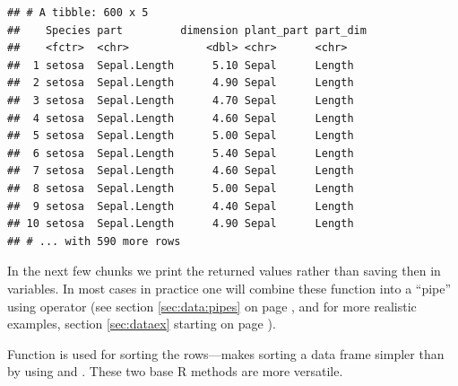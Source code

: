 \documentclass[krantz2,ChapterTOCs]{krantz}\usepackage{knitr}
\begin{document}
\begin{knitrout}\footnotesize
{}\color{fgcolor}\begin{kframe}
\begin{alltt}
 \hlkwb{<-} 
                     \hlstd{=}  \hlstd{),}
                     \hlstd{=}  \hlstd{))}
\end{alltt}
\begin{verbatim}
## # A tibble: 600 x 5
##    Species part         dimension plant_part part_dim
##    <fctr>  <chr>            <dbl> <chr>      <chr>   
##  1 setosa  Sepal.Length      5.10 Sepal      Length  
##  2 setosa  Sepal.Length      4.90 Sepal      Length  
##  3 setosa  Sepal.Length      4.70 Sepal      Length  
##  4 setosa  Sepal.Length      4.60 Sepal      Length  
##  5 setosa  Sepal.Length      5.00 Sepal      Length  
##  6 setosa  Sepal.Length      5.40 Sepal      Length  
##  7 setosa  Sepal.Length      4.60 Sepal      Length  
##  8 setosa  Sepal.Length      5.00 Sepal      Length  
##  9 setosa  Sepal.Length      4.40 Sepal      Length  
## 10 setosa  Sepal.Length      4.90 Sepal      Length  
## # ... with 590 more rows
\end{verbatim}
\end{kframe}
\end{knitrout}

In the next few chunks we print the returned values rather than saving then in variables. In most cases in practice one will combine these function into a ``pipe'' using operator \Roperator{\%>\%} (see section \ref{sec:data:pipes} on page \pageref{sec:data:pipes}, and for more realistic examples, section \ref{sec:dataex} starting on page \pageref{sec:dataex}).

Function  is used for sorting the rows---makes sorting a data frame simpler than by using  and . These two base R methods are more versatile.
\end{document}
